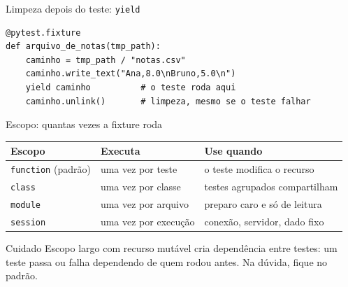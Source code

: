 \documentclass[aspectratio=169]{beamer}
\begin{document}
\begin{frame}[fragile]{Limpeza depois do teste: \texttt{yield}}
\begin{lstlisting}
@pytest.fixture
def arquivo_de_notas(tmp_path):
    caminho = tmp_path / "notas.csv"
    caminho.write_text("Ana,8.0\nBruno,5.0\n")
    yield caminho          # o teste roda aqui
    caminho.unlink()       # limpeza, mesmo se o teste falhar
\end{lstlisting}
  \begin{center}
  \end{center}
\end{frame}

\begin{frame}{Escopo: quantas vezes a fixture roda}
  \begin{center}
  \small
  \begin{tabular}{lll}
    \toprule
    \textbf{Escopo} & \textbf{Executa} & \textbf{Use quando} \\
    \midrule
    \texttt{function} (padrão) & uma vez por teste  & o teste modifica o recurso \\
    \texttt{class}             & uma vez por classe & testes agrupados compartilham \\
    \texttt{module}            & uma vez por arquivo & preparo caro e só de leitura \\
    \texttt{session}           & uma vez por execução & conexão, servidor, dado fixo \\
    \bottomrule
  \end{tabular}
  \end{center}
  \vspace{0.5em}
  \begin{alertblock}{Cuidado}
    Escopo largo com recurso mutável cria dependência entre testes:
    um teste passa ou falha dependendo de quem rodou antes. Na dúvida,
    fique no padrão.
  \end{alertblock}
\end{frame}
\end{document}

